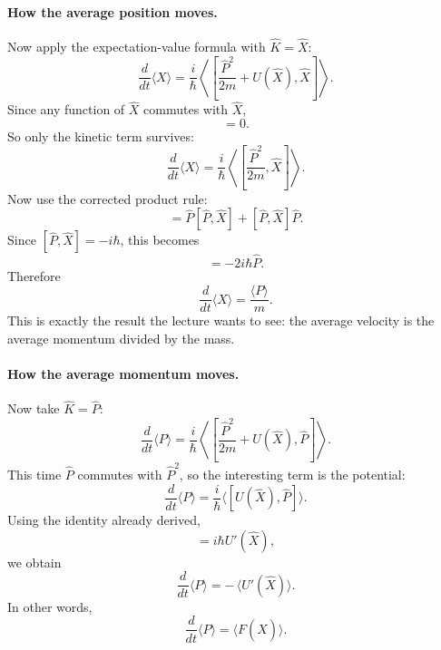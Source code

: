 \paragraph{How the average position moves.}
Now apply the expectation-value formula with \(\hat K=\hat X\):
\begin{equation}
\frac{d}{dt}\langle X\rangle
=
\frac{i}{\hbar}
\left\langle
\left[
\frac{\hat P^2}{2m}+U(\hat X),\hat X
\right]
\right\rangle.
\end{equation}
Since any function of \(\hat X\) commutes with \(\hat X\),
\begin{equation}
[U(\hat X),\hat X]=0.
\end{equation}
So only the kinetic term survives:
\begin{equation}
\frac{d}{dt}\langle X\rangle
=
\frac{i}{\hbar}
\left\langle
\left[
\frac{\hat P^2}{2m},\hat X
\right]
\right\rangle.
\end{equation}
Now use the corrected product rule:
\begin{equation}
[\hat P^2,\hat X]
=
\hat P[\hat P,\hat X]+[\hat P,\hat X]\hat P.
\end{equation}
Since \([\hat P,\hat X]=-i\hbar\), this becomes
\begin{equation}
[\hat P^2,\hat X]=-2i\hbar \hat P.
\end{equation}
Therefore
\begin{equation}
\frac{d}{dt}\langle X\rangle=\frac{\langle P\rangle}{m}.
\end{equation}
This is exactly the result the lecture wants to see: the average velocity is the average momentum divided by the mass.

\paragraph{How the average momentum moves.}
Now take \(\hat K=\hat P\):
\begin{equation}
\frac{d}{dt}\langle P\rangle
=
\frac{i}{\hbar}
\left\langle
\left[
\frac{\hat P^2}{2m}+U(\hat X),\hat P
\right]
\right\rangle.
\end{equation}
This time \(\hat P\) commutes with \(\hat P^2\), so the interesting term is the potential:
\begin{equation}
\frac{d}{dt}\langle P\rangle
=
\frac{i}{\hbar}\langle[U(\hat X),\hat P]\rangle.
\end{equation}
Using the identity already derived,
\begin{equation}
[U(\hat X),\hat P]=i\hbar U'(\hat X),
\end{equation}
we obtain
\begin{equation}
\frac{d}{dt}\langle P\rangle
=
-\,\langle U'(\hat X)\rangle.
\end{equation}
In other words,
\begin{equation}
\frac{d}{dt}\langle P\rangle=\langle F(\hat X)\rangle.
\end{equation}

